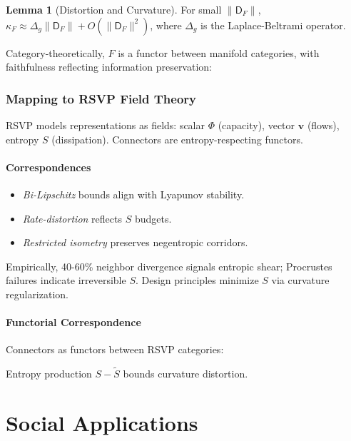 \documentclass{article}
\theoremstyle{definition}
\newtheorem{lemma}[theorem]{Lemma}
\begin{document}
\begin{lemma}[Distortion and Curvature]
For small $\|\mathsf{D}_F\|$, $\kappa_F \approx \Delta_g \|\mathsf{D}_F\| + O(\|\mathsf{D}_F\|^2)$, where $\Delta_g$ is the Laplace-Beltrami operator.
\end{lemma}

Category-theoretically, $F$ is a functor between manifold categories, with faithfulness reflecting information preservation:

\section{Mapping to RSVP Field Theory}
RSVP models representations as fields: scalar $\Phi$ (capacity), vector $\mathbf{v}$ (flows), entropy $S$ (dissipation). Connectors are entropy-respecting functors.

\subsection{Correspondences}
\begin{itemize}
  \item \emph{Bi-Lipschitz} bounds align with Lyapunov stability.
  \item \emph{Rate-distortion} reflects $S$ budgets.
  \item \emph{Restricted isometry} preserves negentropic corridors.
\end{itemize}

Empirically, 40-60\% neighbor divergence signals entropic shear; Procrustes failures indicate irreversible $S$. Design principles minimize $S$ via curvature regularization.

\subsection{Functorial Correspondence}
Connectors as functors between RSVP categories:
Entropy production $S - \tilde{S}$ bounds curvature distortion.

\part{Social Applications}
\end{document}
